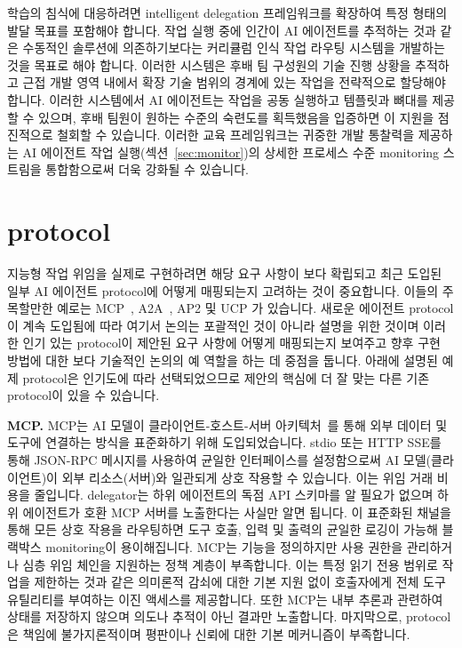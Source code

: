 \documentclass[11pt, a4paper, twocolumn, copyright, goog]{google}
\begin{document}
학습의 침식에 대응하려면 intelligent delegation 프레임워크를 확장하여 특정 형태의 발달 목표를 포함해야 합니다. 작업 실행 중에 인간이 AI 에이전트를 추적하는 것과 같은 수동적인 솔루션에 의존하기보다는 커리큘럼 인식 작업 라우팅 시스템을 개발하는 것을 목표로 해야 합니다. 이러한 시스템은 후배 팀 구성원의 기술 진행 상황을 추적하고 근접 개발 영역 내에서 확장 기술 범위의 경계에 있는 작업을 전략적으로 할당해야 합니다. 이러한 시스템에서 AI 에이전트는 작업을 공동 실행하고 템플릿과 뼈대를 제공할 수 있으며, 후배 팀원이 원하는 수준의 숙련도를 획득했음을 입증하면 이 지원을 점진적으로 철회할 수 있습니다. 이러한 교육 프레임워크는 귀중한 개발 통찰력을 제공하는 AI 에이전트 작업 실행(섹션~\ref{sec:monitor})의 상세한 프로세스 수준 monitoring 스트림을 통합함으로써 더욱 강화될 수 있습니다.

\section{protocol}

지능형 작업 위임을 실제로 구현하려면 해당 요구 사항이 보다 확립되고 최근 도입된 일부 AI 에이전트 protocol에 어떻게 매핑되는지 고려하는 것이 중요합니다. 이들의 주목할만한 예로는 MCP~\citep{mcp, mcp2}, A2A~\citep{agent2agent}, AP2 \citep{parikh2025ap2} 및 UCP \citep{handa2026ucp}가 있습니다. 새로운 에이전트 protocol이 계속 도입됨에 따라 여기서 논의는 포괄적인 것이 아니라 설명을 위한 것이며 이러한 인기 있는 protocol이 제안된 요구 사항에 어떻게 매핑되는지 보여주고 향후 구현 방법에 대한 보다 기술적인 논의의 예 역할을 하는 데 중점을 둡니다. 아래에 설명된 예제 protocol은 인기도에 따라 선택되었으므로 제안의 핵심에 더 잘 맞는 다른 기존 protocol이 있을 수 있습니다.

\textbf{MCP.} MCP는 AI 모델이 클라이언트-호스트-서버 아키텍처~\citep{mcp, mcp2}를 통해 외부 데이터 및 도구에 연결하는 방식을 표준화하기 위해 도입되었습니다. stdio 또는 HTTP SSE를 통해 JSON-RPC 메시지를 사용하여 균일한 인터페이스를 설정함으로써 AI 모델(클라이언트)이 외부 리소스(서버)와 일관되게 상호 작용할 수 있습니다. 이는 위임 거래 비용을 줄입니다. delegator는 하위 에이전트의 독점 API 스키마를 알 필요가 없으며 하위 에이전트가 호환 MCP 서버를 노출한다는 사실만 알면 됩니다. 이 표준화된 채널을 통해 모든 상호 작용을 라우팅하면 도구 호출, 입력 및 출력의 균일한 로깅이 가능해 블랙박스 monitoring이 용이해집니다. MCP는 기능을 정의하지만 사용 권한을 관리하거나 심층 위임 체인을 지원하는 정책 계층이 부족합니다. 이는 특정 읽기 전용 범위로 작업을 제한하는 것과 같은 의미론적 감쇠에 대한 기본 지원 없이 호출자에게 전체 도구 유틸리티를 부여하는 이진 액세스를 제공합니다. 또한 MCP는 내부 추론과 관련하여 상태를 저장하지 않으며 의도나 추적이 아닌 결과만 노출합니다. 마지막으로, protocol은 책임에 불가지론적이며 평판이나 신뢰에 대한 기본 메커니즘이 부족합니다.
\end{document}
